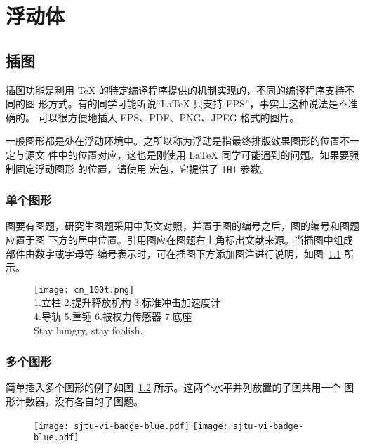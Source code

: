 
\chapter{浮动体}

\section{插图}

插图功能是利用 \TeX{} 的特定编译程序提供的机制实现的，不同的编译程序支持不同的图
形方式。有的同学可能听说“\LaTeX{} 只支持 EPS”，事实上这种说法是不准确的。\XeTeX{}
可以很方便地插入 EPS、PDF、PNG、JPEG 格式的图片。

一般图形都是处在浮动环境中。之所以称为浮动是指最终排版效果图形的位置不一定与源文
件中的位置对应，这也是刚使用 \LaTeX{} 同学可能遇到的问题。如果要强制固定浮动图形
的位置，请使用  宏包，它提供了 \texttt{[H]} 参数。

\subsection{单个图形}

图要有图题，研究生图题采用中英文对照，并置于图的编号之后，图的编号和图题应置于图
下方的居中位置。引用图应在图题右上角标出文献来源。当插图中组成部件由数字或字母等
编号表示时，可在插图下方添加图注进行说明，如图~\ref{fig:cn_100t} 所示。

\begin{figure}[!htp]
  \centering
  \texttt{[image: cn\_100t.png]} \\
    1.立柱 2.提升释放机构 3.标准冲击加速度计 \\
    4.导轨 5.重锤 6.被校力传感器 7.底座 \\
    {Stay hungry, stay foolish.}
 \label{fig:cn_100t}
\end{figure}

\subsection{多个图形}

简单插入多个图形的例子如图~\ref{fig:SRR} 所示。这两个水平并列放置的子图共用一个
图形计数器，没有各自的子图题。

\begin{figure}[!htp]
  \centering
  \texttt{[image: sjtu-vi-badge-blue.pdf]}
  \hspace{1cm}
  \texttt{[image: sjtu-vi-badge-blue.pdf]}
  \label{fig:SRR}
\end{figure}

